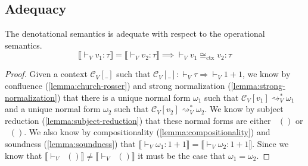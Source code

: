 \documentclass[acmsmall, screen, review, anonymous]{acmart}
\theoremstyle{definition}
\newcommand{\sem}[1]{\llbracket #1 \rrbracket}
\newcommand{\inlname}{\mathop{\mathtt{in}_L}}
\newcommand{\inl}[1]{\inlname #1}
\newcommand{\inrname}{\mathop{\mathtt{in}_R}}
\newcommand{\inr}[1]{\inrname #1}
\newcommand{\types}{\mathrel{:}}
\newcommand{\turnv}{\mathrel{\vdash_V}}
\newcommand{\stepstoname}{\rightsquigarrow}
\newcommand{\reducestoname}{\stepstoname^{*}}
\newcommand{\reducestov}{\reducestoname_{V}}
\newcommand{\ctxeq}{\cong_{\mathrm{ctx}}}
\newcommand{\ctxv}[1]{\mathcal{C}_V[#1]}
\newcommand{\trans}{\Rightarrow}
\begin{document}
\subsection{Adequacy}

The denotational semantics is adequate with respect to the operational semantics.
\begin{equation*}
    \sem{\turnv v_1 \types \tau} = \sem{\turnv v_2 \types \tau}
    \implies \turnv v_1 \ctxeq v_2 \types \tau
\end{equation*}
\begin{proof}
  Given a context $\ctxv{\_}$ such that
  $\ctxv{\_} \types \turnv \tau \trans \turnv 1 + 1$, we know by
  confluence (\ref{lemma:church-rosser}) and strong normalization
  (\ref{lemma:strong-normalization}) that there is a unique normal form
  $\omega_1$ such that $\ctxv{v_1} \reducestov \omega_1$ and a unique
  normal form $\omega_2$ such that $\ctxv{v_2} \reducestov \omega_2$. We
  know by subject reduction (\ref{lemma:subject-reduction}) that these
  normal forms are either $\inl{()}$ or $\inr{()}$. We also know by
  compositionality (\ref{lemma:compositionality}) and soundness
  (\ref{lemma:soundness}) that
  $\sem{\turnv \omega_1 \types 1 + 1} = \sem{\turnv \omega_2 \types 1 +
    1}$. Since we know that
  $\sem{\turnv \inl{()}} \neq \sem{\turnv \inr{()}}$ it must be the case
  that $\omega_1 = \omega_2$.
\end{proof}
\end{document}
